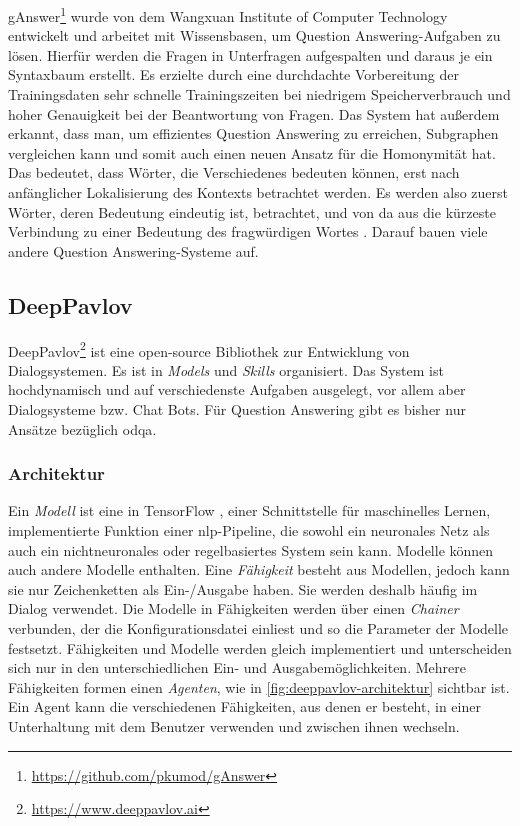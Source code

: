 gAnswer\footnote{\url{https://github.com/pkumod/gAnswer}} \citep{ganswer2} wurde von dem Wangxuan Institute of Computer Technology entwickelt und arbeitet mit Wissensbasen, um Question Answering-Aufgaben zu lösen.
Hierfür werden die Fragen in Unterfragen aufgespalten und daraus je ein Syntaxbaum erstellt.
Es erzielte durch eine durchdachte Vorbereitung der Trainingsdaten sehr schnelle Trainingszeiten bei niedrigem Speicherverbrauch und hoher Genauigkeit bei der Beantwortung von Fragen.
Das System hat außerdem erkannt, dass man, um effizientes Question Answering zu erreichen, Subgraphen vergleichen kann und somit auch einen neuen Ansatz für die Homonymität hat.
Das bedeutet, dass Wörter, die Verschiedenes bedeuten können, erst nach anfänglicher Lokalisierung des Kontexts betrachtet werden.
Es werden also zuerst Wörter, deren Bedeutung eindeutig ist, betrachtet, und von da aus die kürzeste Verbindung zu einer Bedeutung des fragwürdigen Wortes \citep{ganswerapproach}.
Darauf bauen viele andere Question Answering-Systeme auf.

\subsection{DeepPavlov}
DeepPavlov\footnote{\url{https://www.deeppavlov.ai}} \citep{deeppavlov} ist eine open-source Bibliothek zur Entwicklung von Dialogsystemen.
Es ist in \emph{Models} und \emph{Skills} organisiert.
Das System ist hochdynamisch und auf verschiedenste Aufgaben ausgelegt, vor allem aber Dialogsysteme bzw. Chat Bots.
Für Question Answering gibt es bisher nur Ansätze bezüglich \ac{odqa}.

\subsubsection{Architektur}
Ein \emph{Modell} ist eine in TensorFlow \citep{tensorflow}, einer Schnittstelle für maschinelles Lernen, implementierte Funktion einer \ac{nlp}-Pipeline,
die sowohl ein neuronales Netz als auch ein nichtneuronales oder regelbasiertes System sein kann.
Modelle können auch andere Modelle enthalten.
Eine \emph{Fähigkeit} besteht aus Modellen, jedoch kann sie nur Zeichenketten als Ein-/Ausgabe haben.
Sie werden deshalb häufig im Dialog verwendet.
Die Modelle in Fähigkeiten werden über einen \emph{Chainer} verbunden, der die Konfigurationsdatei einliest und so die Parameter der Modelle festsetzt.
Fähigkeiten und Modelle werden gleich implementiert und unterscheiden sich nur in den unterschiedlichen Ein- und Ausgabemöglichkeiten.
Mehrere Fähigkeiten formen einen \emph{Agenten}, wie in \cref{fig:deeppavlov-architektur} sichtbar ist.
Ein Agent kann die verschiedenen Fähigkeiten, aus denen er besteht, in einer Unterhaltung mit dem Benutzer verwenden und zwischen ihnen wechseln.

